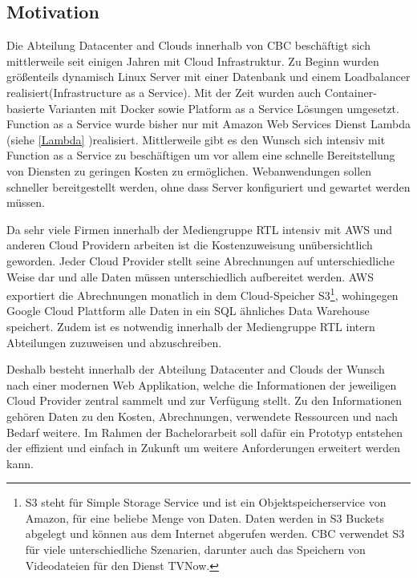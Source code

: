 \subsection{Motivation}
\label{Motivation}
Die Abteilung Datacenter and Clouds innerhalb von CBC beschäftigt sich mittlerweile seit einigen Jahren mit Cloud Infrastruktur.
Zu Beginn wurden größenteils dynamisch Linux Server mit einer Datenbank und einem Loadbalancer realisiert(Infrastructure as a Service).
Mit der Zeit wurden auch Container-basierte Varianten mit Docker sowie Platform as a Service Lösungen umgesetzt.
Function as a Service wurde bisher nur mit Amazon Web Services Dienst Lambda (siehe \ref{Lambda} )realisiert.
Mittlerweile gibt es den Wunsch sich intensiv mit Function as a Service zu beschäftigen um vor allem eine schnelle Bereitstellung von Diensten zu geringen Kosten zu ermöglichen.
Webanwendungen sollen schneller bereitgestellt werden, ohne dass Server konfiguriert und gewartet werden müssen.

Da sehr viele Firmen innerhalb der Mediengruppe RTL intensiv mit AWS und anderen Cloud Providern arbeiten ist die Kostenzuweisung unübersichtlich geworden.
Jeder Cloud Provider stellt seine Abrechnungen auf unterschiedliche Weise dar und alle Daten müssen unterschiedlich aufbereitet werden.
AWS exportiert die Abrechnungen monatlich in dem Cloud-Speicher
S3\footnote{S3 steht für Simple Storage Service und ist ein Objektspeicherservice von Amazon, für eine beliebe Menge von Daten.
Daten werden in S3 Buckets abgelegt und können aus dem Internet abgerufen werden.
CBC verwendet S3 für viele unterschiedliche Szenarien, darunter auch das Speichern von Videodateien für den Dienst TVNow.   }, wohingegen Google Cloud Plattform alle Daten in ein SQL ähnliches Data Warehouse speichert.
Zudem ist es notwendig innerhalb der Mediengruppe RTL intern Abteilungen zuzuweisen und abzuschreiben.

Deshalb besteht innerhalb der Abteilung Datacenter and Clouds der Wunsch nach einer modernen Web Applikation, welche die Informationen der jeweiligen Cloud Provider zentral sammelt und zur Verfügung stellt.
Zu den Informationen gehören Daten zu den Kosten, Abrechnungen, verwendete Ressourcen und nach Bedarf weitere.
Im Rahmen der Bachelorarbeit soll dafür ein Prototyp entstehen der effizient und einfach in Zukunft um weitere Anforderungen erweitert werden kann.
